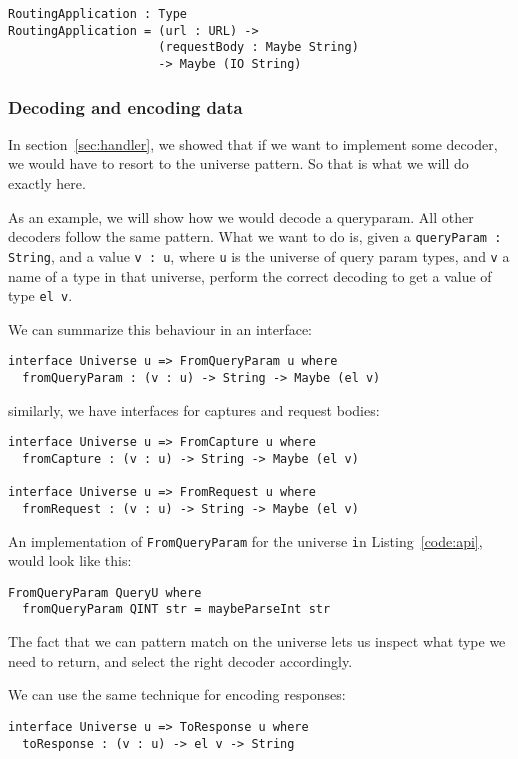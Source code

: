 \documentclass[12pt,a4paper]{article}
\begin{document}
\begin{verbatim}
RoutingApplication : Type
RoutingApplication = (url : URL) ->
                     (requestBody : Maybe String)
                     -> Maybe (IO String)
\end{verbatim}

\subsubsection{Decoding and encoding data}
In section~\ref{sec:handler}, we showed that if we want to implement some decoder, we would have to resort
to the universe pattern. So that is what we will do exactly here.

As an example, we will show how we would decode a queryparam. All other decoders follow the same pattern.
What we want to do is, given a \texttt{queryParam : String}, and a value \texttt{v : u},
where \texttt{u} is the universe of query param types, and  \texttt{v} a name of a type in that universe,
perform the correct decoding to get a value of type \texttt{el v}.

We can summarize this behaviour in an interface:
\begin{verbatim}
interface Universe u => FromQueryParam u where
  fromQueryParam : (v : u) -> String -> Maybe (el v)
\end{verbatim}

similarly, we have interfaces for captures and request bodies:
\begin{verbatim}
interface Universe u => FromCapture u where
  fromCapture : (v : u) -> String -> Maybe (el v)

interface Universe u => FromRequest u where
  fromRequest : (v : u) -> String -> Maybe (el v)
\end{verbatim}

An implementation of \texttt{FromQueryParam} for the universe \texttt in Listing~\ref{code:api}, would look like this:

\begin{verbatim}
FromQueryParam QueryU where
  fromQueryParam QINT str = maybeParseInt str
\end{verbatim}

The fact that we can pattern match on the universe lets us inspect what type we need to return,
and select the right decoder accordingly.

We can use the same technique for encoding responses:
\begin{verbatim}
interface Universe u => ToResponse u where
  toResponse : (v : u) -> el v -> String

\end{verbatim}
\end{document}
